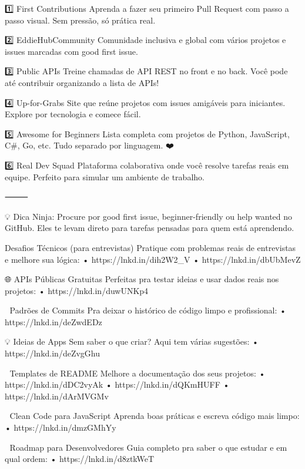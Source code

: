 1️⃣ First Contributions
Aprenda a fazer seu primeiro Pull Request com passo a passo visual. Sem pressão, só prática real.

2️⃣ EddieHubCommunity
Comunidade inclusiva e global com vários projetos e issues marcadas com good first issue.

3️⃣ Public APIs
Treine chamadas de API REST no front e no back. Você pode até contribuir organizando a lista de APIs!

4️⃣ Up-for-Grabs
Site que reúne projetos com issues amigáveis para iniciantes. Explore por tecnologia e comece fácil.

5️⃣ Awesome for Beginners
Lista completa com projetos de Python, JavaScript, C#, Go, etc. Tudo separado por linguagem. ❤️

6️⃣ Real Dev Squad
Plataforma colaborativa onde você resolve tarefas reais em equipe. Perfeito para simular um ambiente de trabalho.

⸻

💡 Dica Ninja:
Procure por good first issue, beginner-friendly ou help wanted no GitHub.
Eles te levam direto para tarefas pensadas para quem está aprendendo.

 Desafios Técnicos (para entrevistas)
Pratique com problemas reais de entrevistas e melhore sua lógica:
 • https://lnkd.in/dih2W2_V
 • https://lnkd.in/dbUbMevZ

🌐 APIs Públicas Gratuitas
Perfeitas pra testar ideias e usar dados reais nos projetos:
 • https://lnkd.in/duwUNKp4

📜 Padrões de Commits
Pra deixar o histórico de código limpo e profissional:
 • https://lnkd.in/deZwdEDz

💡 Ideias de Apps
Sem saber o que criar? Aqui tem várias sugestões:
 • https://lnkd.in/deZvgGhu

📝 Templates de README
Melhore a documentação dos seus projetos:
 • https://lnkd.in/dDC2vyAk
 • https://lnkd.in/dQKmHUFF
 • https://lnkd.in/dArMVGMv

🎯 Clean Code para JavaScript
Aprenda boas práticas e escreva código mais limpo:
 • https://lnkd.in/dmzGMhYy

🚀 Roadmap para Desenvolvedores
Guia completo pra saber o que estudar e em qual ordem:
 • https://lnkd.in/d8ztkWeT
